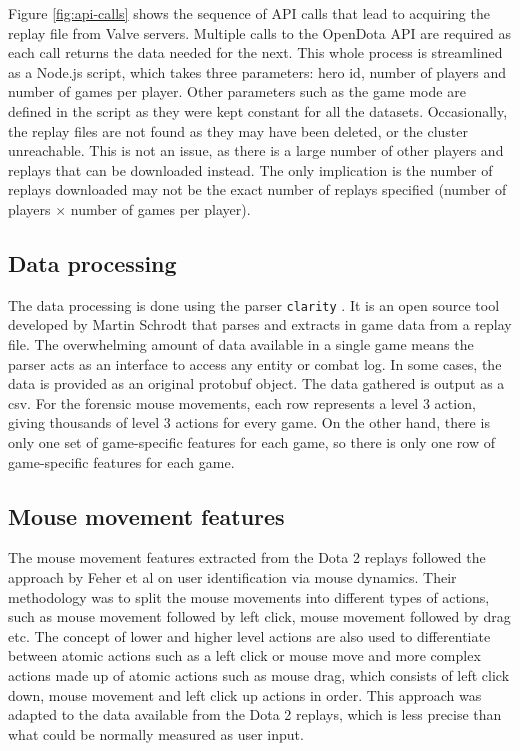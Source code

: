 \documentclass[Report.tex]{subfiles}
\begin{document}
Figure \ref{fig:api-calls} shows the sequence of API calls that lead to acquiring the replay file from Valve servers. Multiple calls to the OpenDota API are required as each call returns the data needed for the next. This whole process is streamlined as a Node.js script, which takes three parameters: hero id, number of players and number of games per player. Other parameters such as the game mode are defined in the script as they were kept constant for all the datasets. Occasionally, the replay files are not found as they may have been deleted, or the cluster unreachable. This is not an issue, as there is a large number of other players and replays that can be downloaded instead. The only implication is the number of replays downloaded may not be the exact number of replays specified (number of players $\times$ number of games per player).

\subsection{Data processing}
The data processing is done using the parser \texttt{clarity} \cite{clarity}. It is an open source tool developed by Martin Schrodt that parses and extracts in game data from a replay file. The overwhelming amount of data available in a single game means the parser acts as an interface to access any entity or combat log. In some cases, the data is provided as an original protobuf object. The data gathered is output as a csv. For the forensic mouse movements, each row represents a level 3 action, giving thousands of level 3 actions for every game. On the other hand, there is only one set of game-specific features for each game, so there is only one row of game-specific features for each game. 

\subsection{Mouse movement features}\label{sec:mm-features}
The mouse movement features extracted from the Dota 2 replays followed the approach by Feher et al \cite{mouse-dynamics} on user identification via mouse dynamics. Their methodology was to split the mouse movements into different types of actions, such as mouse movement followed by left click, mouse movement followed by drag etc. The concept of lower and higher level actions are also used to differentiate between atomic actions such as a left click or mouse move and more complex actions made up of atomic actions such as mouse drag, which consists of left click down, mouse movement and left click up actions in order. This approach was adapted to the data available from the Dota 2 replays, which is less precise than what could be normally measured as user input. 
\end{document}
